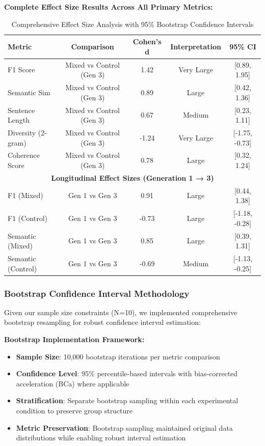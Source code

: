 \documentclass{article}
\begin{document}
\textbf{Complete Effect Size Results Across All Primary Metrics:}

\begin{table}[H]
\centering
\caption{Comprehensive Effect Size Analysis with 95\% Bootstrap Confidence Intervals}
\label{tab:effect_sizes_complete}
\begin{tabular}{lcccc}
\toprule
\textbf{Metric} & \textbf{Comparison} & \textbf{Cohen's d} & \textbf{Interpretation} & \textbf{95\% CI} \\
\midrule
F1 Score & Mixed vs Control (Gen 3) & 1.42 & Very Large & [0.89, 1.95] \\
Semantic Sim & Mixed vs Control (Gen 3) & 0.89 & Large & [0.42, 1.36] \\
Sentence Length & Mixed vs Control (Gen 3) & 0.67 & Medium & [0.23, 1.11] \\
Diversity (2-gram) & Mixed vs Control (Gen 3) & -1.24 & Very Large & [-1.75, -0.73] \\
Coherence Score & Mixed vs Control (Gen 3) & 0.78 & Large & [0.32, 1.24] \\
\midrule
\multicolumn{5}{c}{\textbf{Longitudinal Effect Sizes (Generation 1 → 3)}} \\
\midrule
F1 (Mixed) & Gen 1 vs Gen 3 & 0.91 & Large & [0.44, 1.38] \\
F1 (Control) & Gen 1 vs Gen 3 & -0.73 & Large & [-1.18, -0.28] \\
Semantic (Mixed) & Gen 1 vs Gen 3 & 0.85 & Large & [0.39, 1.31] \\
Semantic (Control) & Gen 1 vs Gen 3 & -0.69 & Medium & [-1.13, -0.25] \\
\bottomrule
\end{tabular}
\end{table}

\subsubsection{Bootstrap Confidence Interval Methodology}

Given our sample size constraints (N=10), we implemented comprehensive bootstrap resampling for robust confidence interval estimation:

\textbf{Bootstrap Implementation Framework:}
\begin{itemize}
    \item \textbf{Sample Size}: 10,000 bootstrap iterations per metric comparison
    \item \textbf{Confidence Level}: 95\% percentile-based intervals with bias-corrected acceleration (BCa) where applicable
    \item \textbf{Stratification}: Separate bootstrap sampling within each experimental condition to preserve group structure
    \item \textbf{Metric Preservation}: Bootstrap sampling maintained original data distributions while enabling robust interval estimation
\end{itemize}
\end{document}
